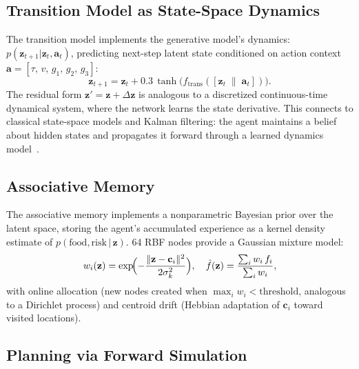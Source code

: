 \documentclass[11pt,a4paper]{article}
\begin{document}
\subsection{Transition Model as State-Space Dynamics}

The transition model implements the generative model's dynamics:
$p(\mathbf{z}_{t+1}|\mathbf{z}_t, \mathbf{a}_t)$,
predicting next-step latent state conditioned on action context
$\mathbf{a} = [\tau,\, v,\, g_1,\, g_2,\, g_3]$:
\begin{equation}\label{eq:transition}
  \mathbf{z}_{t+1} = \mathbf{z}_t + 0.3\,\tanh\!\bigl(f_\text{trans}([\mathbf{z}_t\;\|\;\mathbf{a}_t])\bigr).
\end{equation}
The residual form $\mathbf{z}' = \mathbf{z} + \Delta\mathbf{z}$ is
analogous to a discretized continuous-time dynamical system, where the
network learns the state derivative.
This connects to classical state-space models and Kalman filtering:
the agent maintains a belief about hidden states and propagates it
forward through a learned dynamics model~\cite{friston2010}.

\subsection{Associative Memory}

The associative memory implements a nonparametric Bayesian prior over the
latent space, storing the agent's accumulated experience as a kernel density
estimate of $p(\text{food}, \text{risk}\,|\,\mathbf{z})$.
64 RBF nodes provide a Gaussian mixture model:
\begin{equation}\label{eq:assoc_mem}
  w_i(\mathbf{z}) = \exp\!\Bigl(-\frac{\|\mathbf{z} - \mathbf{c}_i\|^2}{2\sigma_k^2}\Bigr),
  \quad
  \hat{f}(\mathbf{z}) = \frac{\sum_i w_i\,f_i}{\sum_i w_i},
\end{equation}
with online allocation (new nodes created when
$\max_i w_i < \text{threshold}$, analogous to a Dirichlet process) and
centroid drift (Hebbian adaptation of $\mathbf{c}_i$ toward visited
locations).

\subsection{Planning via Forward Simulation}
\end{document}

